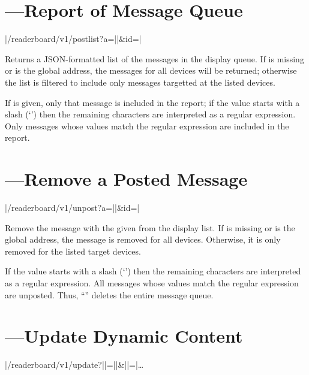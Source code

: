 \section{---Report of Message Queue}
\begin{center}
	\begin{Coding}
		|/readerboard/v1/postlist?a=||&id=|
	\end{Coding}
\end{center}

Returns a JSON-formatted list of the messages in the display queue. If  is missing or is the
global address, the messages for all devices will be returned; otherwise the list is filtered to include
only messages targetted at the listed devices.

If  is given, only that message is included in the report; if the  value starts with a slash
(`\z{/}') then the remaining characters are interpreted as a regular expression. Only messages whose  values match the
regular expression are included in the report.

\section{---Remove a Posted Message}
\begin{center}
	\begin{Coding}
		|/readerboard/v1/unpost?a=||&id=|\Var*{id}
	\end{Coding}
\end{center}

Remove the message with the given  from the display list.
If  is missing or is the global address, the message is removed for all devices. Otherwise,
it is only removed for the listed target devices.

If the  value starts with a slash
(`\z{/}') then the remaining characters are interpreted as a regular expression. All messages whose  values match the
regular expression are unposted. Thus, ``'' deletes the entire message queue.

\section{---Update Dynamic Content}
\begin{center}
	\begin{Coding}
		|/readerboard/v1/update?||=||&||=|\dots
	\end{Coding}
\end{center}

